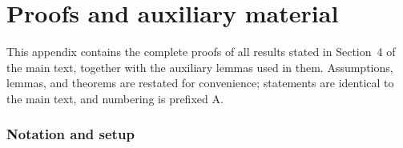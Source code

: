\appendix
\setcounter{theorem}{0}\setcounter{lemma}{0}\setcounter{corollary}{0}
\setcounter{assumption}{0}\setcounter{remark}{0}\setcounter{equation}{0}
\renewcommand{\thetheorem}{A\arabic{theorem}}
\renewcommand{\thelemma}{A\arabic{lemma}}
\renewcommand{\thecorollary}{A\arabic{corollary}}
\renewcommand{\theassumption}{A\arabic{assumption}}
\renewcommand{\theremark}{A\arabic{remark}}
\renewcommand{\theequation}{A\arabic{equation}}
\renewcommand{\thefigure}{A\arabic{figure}}

\section{Proofs and auxiliary material}\label{app:proofs}

This appendix contains the complete proofs of all results stated in
Section~4 of the main text, together with the auxiliary lemmas used in
them. Assumptions, lemmas, and theorems are restated for convenience;
statements are identical to the main text, and numbering is prefixed
A.

\subsubsection{Notation and setup}\label{app:sec:setup}

